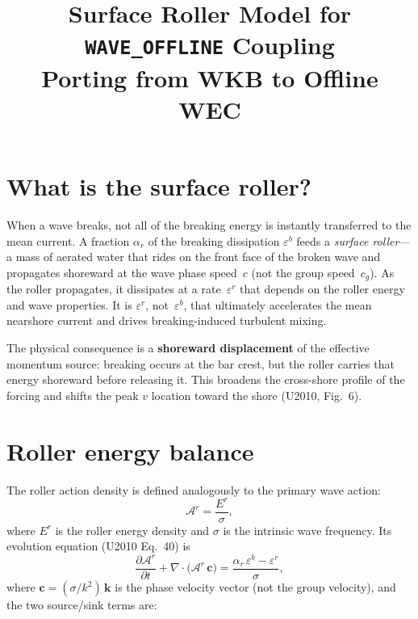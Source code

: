 \documentclass[11pt]{article}
\title{Surface Roller Model for \texttt{WAVE\_OFFLINE} Coupling\\[4pt]
\large Porting from WKB to Offline WEC}
\author{}
\date{}
\begin{document}
\maketitle

\section{What is the surface roller?}

When a wave breaks, not all of the breaking energy is instantly transferred to
the mean current. A fraction $\alpha_r$ of the breaking dissipation
$\varepsilon^b$ feeds a \emph{surface roller}---a mass of aerated water that
rides on the front face of the broken wave and propagates shoreward at the
wave phase speed~$c$ (not the group speed~$c_g$). As the roller propagates,
it dissipates at a rate~$\varepsilon^r$ that depends on the roller energy and
wave properties. It is $\varepsilon^r$, not~$\varepsilon^b$, that ultimately
accelerates the mean nearshore current and drives breaking-induced turbulent
mixing.

The physical consequence is a \textbf{shoreward displacement} of the effective
momentum source: breaking occurs at the bar crest, but the roller carries that
energy shoreward before releasing it. This broadens the cross-shore profile of
the forcing and shifts the peak $v$ location toward the shore (U2010, Fig.~6).

\section{Roller energy balance}

The roller action density is defined analogously to the primary wave action:
\begin{equation}
  \mathscr{A}^r = \frac{E^r}{\sigma},
  \label{eq:roller_action}
\end{equation}
where $E^r$ is the roller energy density and $\sigma$ is the intrinsic wave
frequency. Its evolution equation (U2010 Eq.~40) is
\begin{equation}
  \frac{\partial\mathscr{A}^r}{\partial t}
  + \nabla\!\cdot\!\bigl(\mathscr{A}^r\,\mathbf{c}\bigr)
  = \frac{\alpha_r\,\varepsilon^b - \varepsilon^r}{\sigma},
  \label{eq:roller_balance}
\end{equation}
where $\mathbf{c} = (\sigma/k^2)\,\mathbf{k}$ is the phase velocity vector
(not the group velocity), and the two source/sink terms are:
\end{document}
